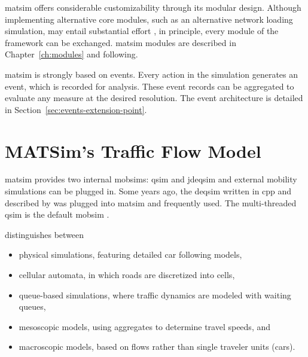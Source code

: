 \gls{matsim} offers considerable customizability through its modular design. Although %
implementing alternative core modules, such as an alternative network loading simulation, may entail substantial effort \citep[][Section 2.4]{MATSim_Userguide_2015}, in principle, every module of the framework can be exchanged. \gls{matsim} modules are described in Chapter~\ref{ch:modules} and following.

\gls{matsim} is strongly based on events. Every action in the simulation generates an event, which is recorded for analysis. These event records can be aggregated to evaluate any measure at the desired resolution. The event architecture is detailed in Section~\ref{sec:events-extension-point}.

\section{MATSim's Traffic Flow Model}
\label{sec:trafficflowmodel}
\gls{matsim} provides two internal \glspl{mobsim}: \gls{qsim} and \gls{jdeqsim} and external mobility simulations can be plugged in. Some years ago, the \gls{deqsim} written in \gls{cpp} and described by \citet[][]{Charypar_PhDThesis_2008, CharyparEtAl_TRR_2007, CharyparEtAl_TRB_2009, CharyparEtAl_WCTRS_2007} was plugged into \gls{matsim} and frequently used. The multi-threaded \gls{qsim} is the default \gls{mobsim} \citep[][]{MATSim_Userguide_2015}. %

\citet[][]{CharyparEtAl_TRB_2009} distinguishes between 
\begin{itemize}\styleItemize
\item physical simulations, featuring detailed car following models, %
\item cellular automata, in which roads are discretized into cells,
\item queue-based simulations, where traffic dynamics are modeled with waiting queues,
\item mesoscopic models, using aggregates to determine travel speeds, and
\item macroscopic models, based on flows rather than single traveler units (\eg cars).
\end{itemize}

